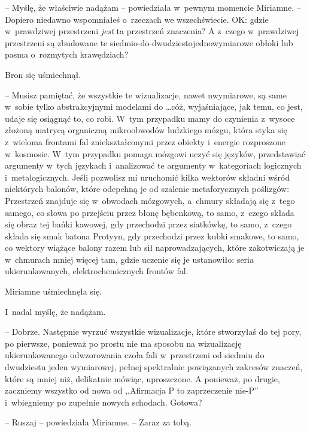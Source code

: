 \documentclass[oneside,polish,11pt,rmheadings]{mwbk}
\begin{document}
-- Myślę, że właściwie nadążam -- powiedziała w~pewnym momencie Miriamne. -- Dopiero niedawno wspomniałeś o~rzeczach we wszechświecie. OK: gdzie w~prawdziwej przestrzeni \textit{jest }ta przestrzeń znaczenia? A z~czego w~prawdziwej przestrzeni są zbudowane te siedmio-do-dwudziestojednowymiarowe obłoki lub pasma o~rozmytych krawędziach? 

Bron się uśmiechnął. 

-- Musisz pamiętać, że wszystkie te wizualizacje, nawet n\dywiz wymiarowe, są same w~sobie tylko abstrakcyjnymi modelami do \ldots  cóż, wyjaśniające, jak temu, co jest, udaje się osiągnąć to, co robi. W~tym przypadku mamy do czynienia z~wysoce złożoną matrycą organiczną mikroobwodów ludzkiego mózgu, która styka się z~wieloma frontami fal zniekształconymi przez obiekty i~energie rozproszone w~kosmosie. W~tym przypadku pomaga mózgowi uczyć się języków, przedstawiać argumenty w~tych językach i~analizować te argumenty w~kategoriach logicznych i~metalogicznych. Jeśli pozwolisz mi uruchomić kilka wektorów składni wśród niektórych balonów, które odepchną je od szalenie metaforycznych poślizgów: Przestrzeń znajduje się w~obwodach mózgowych, a~chmury składają się z~tego samego, co słowa po przejściu przez błonę bębenkową, to samo, z~czego składa się obraz tej bańki kawowej, gdy przechodzi przez siatkówkę, to samo, z~czego składa się smak batona Protyyn, gdy przechodzi przez kubki smakowe, to samo, co wektory wiążące balony razem lub sił naprowadzających, które zakotwiczają je w~chmurach mniej więcej tam, gdzie uczenie się je ustanowiło: seria ukierunkowanych, elektrochemicznych frontów fal. 

Miriamne uśmiechnęła się. 

I~nadal myślę, że nadążam. 

-- Dobrze. Następnie wyrzuć wszystkie wizualizacje, które stworzyłaś do tej pory, po pierwsze, ponieważ po prostu nie ma sposobu na wizualizację ukierunkowanego odwzorowania czoła fali w~przestrzeni od siedmiu do dwudziestu jeden wymiarowej, pełnej spektralnie powiązanych zakresów znaczeń, które są mniej niż, delikatnie mówiąc, uproszczone. A ponieważ, po drugie, zaczniemy wszystko od nowa od ,,Afirmacja P to zaprzeczenie nie-P'' i~wbiegniemy po zupełnie nowych schodach. Gotowa? 

-- Ruszaj -- powiedziała Miriamne. -- Zaraz za tobą. 
\end{document}
